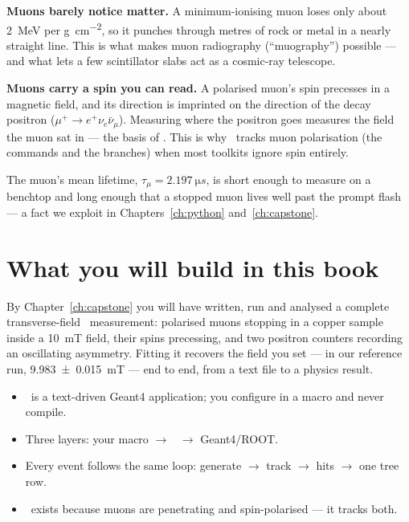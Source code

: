\begin{physics}
\textbf{Muons barely notice matter.} A minimum-ionising muon loses only about \SI{2}{MeV} per \si{g.cm^{-2}}, so it punches through metres of rock or metal in a nearly straight line. This is what makes muon radiography (``muography'') possible --- and what lets a few scintillator slabs act as a cosmic-ray telescope.
\end{physics}

\begin{physics}
\textbf{Muons carry a spin you can read.} A polarised muon's spin precesses in a magnetic field, and its direction is imprinted on the direction of the decay positron (\(\mu^+\to e^+\nu_e\bar\nu_\mu\)). Measuring where the positron goes measures the field the muon sat in --- the basis of \muSR. This is why \musrSim\ tracks muon polarisation (the  commands and the  branches) when most toolkits ignore spin entirely.
\end{physics}

The muon's mean lifetime, \(\tau_\mu=\SI{2.197}{\micro s}\), is short enough to measure on a benchtop and long enough that a stopped muon lives well past the prompt flash --- a fact we exploit in Chapters~\ref{ch:python} and~\ref{ch:capstone}.

\section{What you will build in this book}
By Chapter~\ref{ch:capstone} you will have written, run and analysed a complete transverse-field \muSR\ measurement: polarised muons stopping in a copper sample inside a \SI{10}{mT} field, their spins precessing, and two positron counters recording an oscillating asymmetry. Fitting it recovers the field you set --- in our reference run, \SI{9.983(15)}{mT} --- end to end, from a text file to a physics result.

\begin{recap}
\begin{itemize}
  \item \musrSim\ is a text-driven Geant4 application; you configure in a macro and never compile.
  \item Three layers: your macro \(\rightarrow\) \musrSim\ \(\rightarrow\) Geant4/ROOT.
  \item Every event follows the same loop: generate \(\rightarrow\) track \(\rightarrow\) hits \(\rightarrow\) one tree row.
  \item \musrSim\ exists because muons are penetrating and spin-polarised --- it tracks both.
\end{itemize}
\end{recap}
